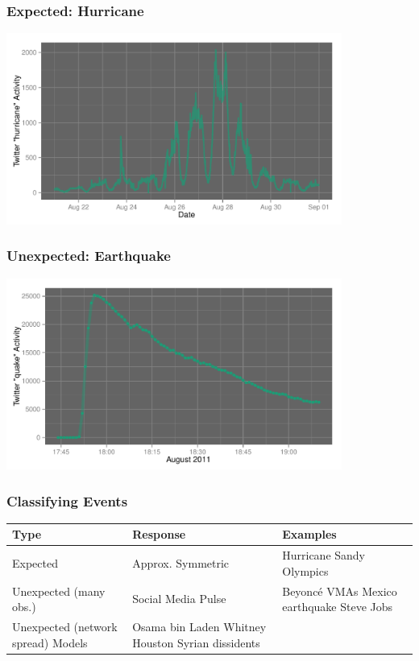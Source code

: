\documentclass{beamer}
\begin{document}
\begin{frame}\frametitle{Expected: Hurricane}
  \begin{center}
    \includegraphics[width=11cm]{./imgs/SMP_hurricane.pdf}
  \end{center}
\end{frame}

\begin{frame}\frametitle{Unexpected: Earthquake}
  \begin{center}
    \includegraphics[width=11cm]{./imgs/SMP_va_quake.pdf}
  \end{center}
\end{frame}



\begin{frame}\frametitle{Classifying Events}
\begin{table}
\begin{tabular}{ m{2cm} | m{ 2.5cm} | m{4cm}}
\hline
Type & Response & Examples \\ \hline
Expected    & Approx. \newline Symmetric & Hurricane Sandy \newline Olympics \\ \hline
Unexpected (many obs.) & Social Media \newline Pulse & Beyonc\'{e} VMAs \newline  Mexico earthquake \newline  Steve Jobs \\ \hline
Unexpected  (network spread) \newline Models & Osama bin Laden \newline  Whitney Houston \newline  Syrian dissidents \\ \hline
\end{tabular}
\end{table}
\end{frame}
\end{document}
